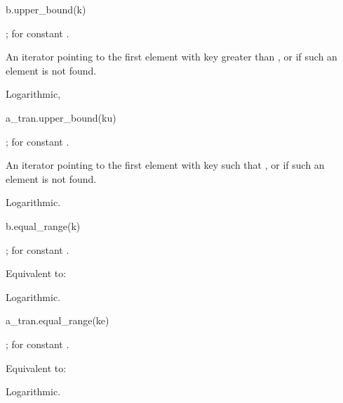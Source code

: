 %
\begin{itemdecl}
b.upper_bound(k)
\end{itemdecl}

\begin{itemdescr}
\pnum
\result
{};  for constant .

\pnum
\returns
An iterator pointing to the first element with key greater than ,
or  if such an element is not found.

\pnum
\complexity
Logarithmic,
\end{itemdescr}

%
\begin{itemdecl}
a_tran.upper_bound(ku)
\end{itemdecl}

\begin{itemdescr}
\pnum
\result
{};  for constant .

\pnum
\returns
An iterator pointing to the first element with key 
such that ,
or  if such an element is not found.

\pnum
\complexity
Logarithmic.
\end{itemdescr}

%
\begin{itemdecl}
b.equal_range(k)
\end{itemdecl}

\begin{itemdescr}
\pnum
\result
{};
 for constant .

\pnum
\effects
Equivalent to: 

\pnum
\complexity
Logarithmic.
\end{itemdescr}

%
\begin{itemdecl}
a_tran.equal_range(ke)
\end{itemdecl}

\begin{itemdescr}
\pnum
\result
{};
 for constant .

\pnum
\effects
Equivalent to:

\pnum
\complexity
Logarithmic.
\end{itemdescr}

